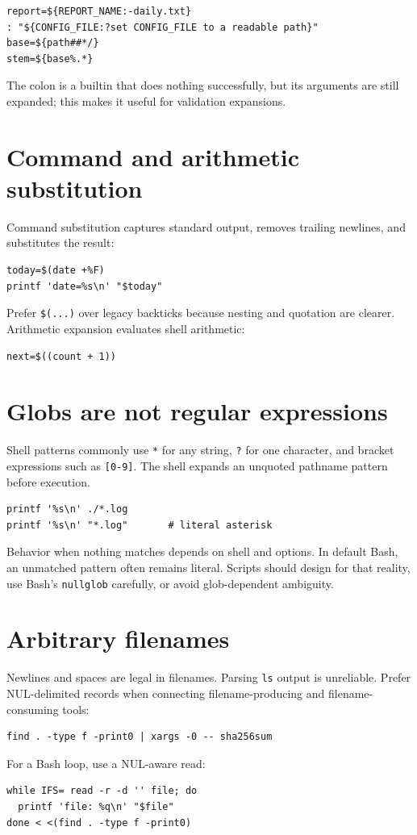 \documentclass[11pt,oneside,openany]{book}
\begin{document}
\begin{lstlisting}
report=${REPORT_NAME:-daily.txt}
: "${CONFIG_FILE:?set CONFIG_FILE to a readable path}"
base=${path##*/}
stem=${base%.*}
\end{lstlisting}
The colon is a builtin that does nothing successfully, but its arguments are still expanded; this makes it useful for validation expansions.

\section{Command and arithmetic substitution}
Command substitution captures standard output, removes trailing newlines, and substitutes the result:
\begin{lstlisting}
today=$(date +%F)
printf 'date=%s\n' "$today"
\end{lstlisting}
Prefer \texttt{\$(...)} over legacy backticks because nesting and quotation are clearer. Arithmetic expansion evaluates shell arithmetic:
\begin{lstlisting}
next=$((count + 1))
\end{lstlisting}

\section{Globs are not regular expressions}
Shell patterns commonly use \texttt{*} for any string, \texttt{?} for one character, and bracket expressions such as \texttt{[0-9]}. The shell expands an unquoted pathname pattern before execution.
\begin{lstlisting}
printf '%s\n' ./*.log
printf '%s\n' "*.log"       # literal asterisk
\end{lstlisting}
Behavior when nothing matches depends on shell and options. In default Bash, an unmatched pattern often remains literal. Scripts should design for that reality, use Bash's \texttt{nullglob} carefully, or avoid glob-dependent ambiguity.

\section{Arbitrary filenames}
Newlines and spaces are legal in filenames. Parsing \texttt{ls} output is unreliable. Prefer NUL-delimited records when connecting filename-producing and filename-consuming tools:
\begin{lstlisting}
find . -type f -print0 | xargs -0 -- sha256sum
\end{lstlisting}
For a Bash loop, use a NUL-aware read:
\begin{lstlisting}
while IFS= read -r -d '' file; do
  printf 'file: %q\n' "$file"
done < <(find . -type f -print0)
\end{lstlisting}
\end{document}
